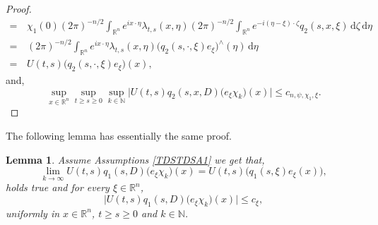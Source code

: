 \documentclass[a4paper, 12pt]{report}
\newtheorem{lemma}[theorem]{Lemma}
\theoremstyle{cor}
\theoremstyle{remark}
\theoremstyle{definition}
\begin{document}
\begin{proof}
$$\begin{aligned}
= & \, \chi_1(0)(2\pi)^{-n/2}\int_{\mathbb{R}^n}e^{ix\cdot\eta}\lambda_{t, s}(x, \eta)(2\pi)^{-n/2}\int_{\mathbb{R}^n}e^{-i(\eta - \xi)\cdot \zeta}q_2(s, x, \xi)\,\mathrm{d}\zeta\,\mathrm{d}\eta\\
= & \, (2\pi)^{-n/2}\int_{\mathbb{R}^n}e^{ix\cdot\eta}\lambda_{t, s}(x, \eta)\big(q_2(s, \cdot, \xi)e_\xi\big)^\wedge(\eta)\,\mathrm{d}\eta\\
= & \, U(t, s)\big(q_2(s, \cdot, \xi)e_\xi\big)(x),
\end{aligned}
$$
and,
$$
\sup_{x \in \mathbb{R}^n}\sup_{t \ge s \ge 0}\sup_{k \in \mathbb{N}}\big|U(t, s)q_2(s, x, D)\big(e_\xi\chi_k\big)(x)\big| \le c_{n, \psi, \chi_1, \xi}.
$$
\end{proof}

The following lemma has essentially the same proof.
\begin{lemma}\label{TDSSoAPL4}
Assume Assumptions \ref{TDSTDSA1} we get that,
$$
\lim_{k \to \infty}U(t, s)q_1(s, D)\big(e_\xi\chi_k\big)(x) = U(t, s)\big(q_1(s, \xi)e_\xi(x)\big),
$$
holds true and for every $\xi \in \mathbb{R}^n$,
$$
\big|U(t, s)q_1(s, D)\big(e_\xi\chi_k\big)(x)\big| \le c_\xi,
$$
uniformly in $x \in \mathbb{R}^n$, $t \ge s \ge 0$ and $k \in \mathbb{N}$.
\end{lemma}
\end{document}
